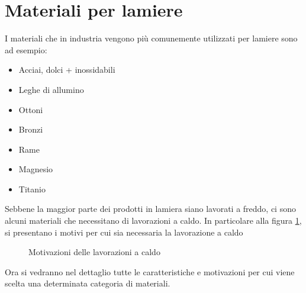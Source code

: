 \section{Materiali per lamiere}
I materiali che in industria vengono più comunemente utilizzati per lamiere sono ad esempio:
\begin{itemize}
\item Acciai, dolci + inossidabili
\item Leghe di allumino
\item Ottoni
\item Bronzi
\item Rame
\item Magnesio
\item Titanio
\end{itemize}
Sebbene la maggior parte dei prodotti in lamiera siano lavorati a freddo, ci sono alcuni materiali che necessitano di lavorazioni a caldo.
In particolare alla figura \ref{fig:LavCaldo}, si presentano i motivi per cui sia necessaria la lavorazione a caldo

\begin{figure}
\centering
\usetikzlibrary{trees}
\caption{Motivazioni delle lavorazioni a caldo}
\label{fig:LavCaldo}
\end{figure}
Ora si vedranno nel dettaglio tutte le caratteristiche e motivazioni per cui viene scelta una determinata categoria di materiali.

